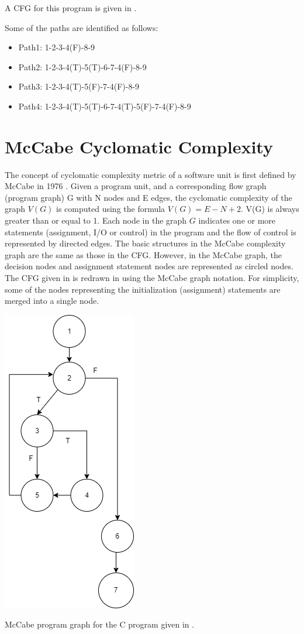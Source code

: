 A CFG for this program is given in .

Some of the paths are identified as follows:
\begin{itemize}
    \item Path1: 1-2-3-4(F)-8-9
    \item Path2: 1-2-3-4(T)-5(T)-6-7-4(F)-8-9
    \item Path3: 1-2-3-4(T)-5(F)-7-4(F)-8-9
    \item Path4: 1-2-3-4(T)-5(T)-6-7-4(T)-5(F)-7-4(F)-8-9
\end{itemize}

\section{McCabe Cyclomatic Complexity}
The concept of cyclomatic complexity metric of a software unit is first defined by McCabe in 1976 \autocite{mccabe1976complexity}. Given a program unit, and a corresponding flow graph (program graph) G with N nodes and E edges, the cyclomatic complexity of the graph $V(G)$ is computed using the formula $V(G) = E - N + 2$. V(G) is always greater than or equal to 1. Each node in the graph $G$ indicates one or more statements (assignment, I/O or control) in the program and the flow of control is represented by directed edges. The basic structures in the McCabe complexity graph are the same as those in the CFG. However, in the McCabe graph, the decision nodes and assignment statement nodes are represented as circled nodes. The CFG given in  is redrawn in  using the McCabe graph notation. For simplicity, some of the nodes representing the initialization (assignment) statements are merged into a single node.

\begin{marginfigure}[-1cm]
    \includegraphics{images/cfg-34.png}
    \caption{McCabe program graph for the C program given in .}
\end{marginfigure}

